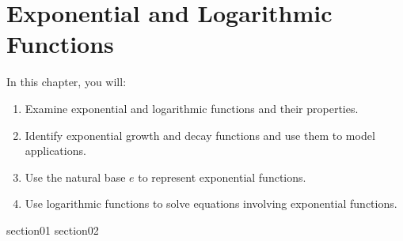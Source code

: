 \chapter{Exponential and Logarithmic Functions}

In this chapter, you will:
\begin{enumerate}
    \item Examine exponential and logarithmic functions and their properties.
    \item Identify exponential growth and decay functions and use them to model applications.
    \item Use the natural base \( e \) to represent exponential functions.
    \item Use logarithmic functions to solve equations involving exponential functions.
\end{enumerate}


{section01}
{section02}
